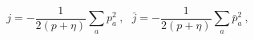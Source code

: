 \begin{equation}
j = -\frac{1}{2(p+\eta)}\sum_a p_a^2~, ~~~
\bar{j} = -\frac{1}{2(p+\eta)}\sum_a \bar{p}_a^2~,
\end{equation} 
